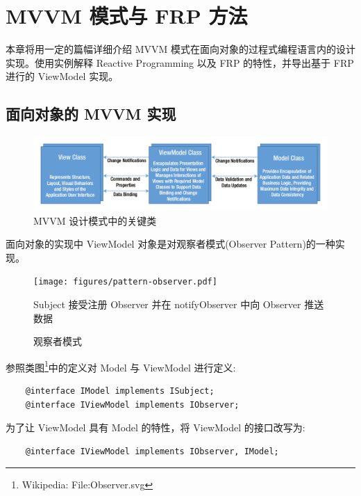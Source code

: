 \chapter{MVVM 模式与 FRP 方法}

本章将用一定的篇幅详细介绍 MVVM 模式在面向对象的过程式编程语言内的设计实现。使用实例解释 Reactive Programming 以及 FRP 的特性，并导出基于 FRP 进行的 ViewModel 实现。

\section{面向对象的 MVVM 实现}

\begin{figure}[!h]
  \begin{center}
    \includegraphics[scale=0.5]{figures/diagram-mvvm-pattern-ref.png}
    \caption{MVVM 设计模式中的关键类~\cite{ghoda2012windows}\label{MVVMCoreClasses}}
  \end{center}
\end{figure}

面向对象的实现中 ViewModel 对象是对观察者模式(Observer Pattern)的一种实现。

\begin{figure}[!h]
  \begin{center}
    \texttt{[image: figures/pattern-observer.pdf]}
    \caption{观察者模式\label{PatternObserver}}
    Subject 接受注册 Observer 并在 notifyObserver 中向 Observer 推送数据
  \end{center}
\end{figure}

参照类图\footnote{Wikipedia: File:Observer.svg}中的定义对 Model 与 ViewModel 进行定义:

\begin{verbatim}
    @interface IModel implements ISubject;
    @interface IViewModel implements IObserver;
\end{verbatim}

为了让 ViewModel 具有 Model 的特性，将 ViewModel 的接口改写为:

\begin{verbatim}
    @interface IViewModel implements IObserver, IModel;
\end{verbatim}

